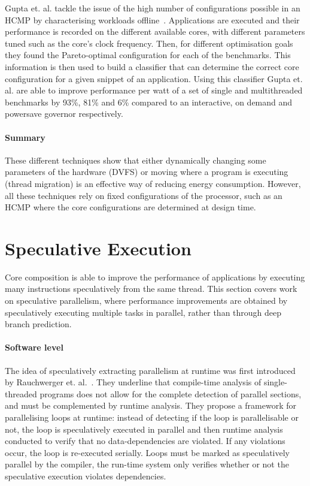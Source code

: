 Gupta et. al. tackle the issue of the high number of configurations possible in an HCMP by characterising workloads offline~\cite{Gupta2017Dypo}.
Applications are executed and their performance is recorded on the different available cores, with different parameters tuned such as the core's clock frequency.
Then, for different optimisation goals they found the Pareto-optimal configuration for each of the benchmarks.
This information is then used to build a classifier that can determine the correct core configuration for a given snippet of an application.
Using this classifier Gupta et. al. are able to improve performance per watt of a set of single and multithreaded benchmarks by 93\%, 81\% and 6\% compared to an interactive, on demand and powersave governor respectively.

\paragraph*{Summary}
These different techniques show that either dynamically changing some parameters of the hardware (DVFS) or moving where a program is executing (thread migration) is an effective way of reducing energy consumption.
However, all these techniques rely on fixed configurations of the processor, such as an HCMP where the core configurations are determined at design time. 
\vspace{-1em}
\section{Speculative Execution}
Core composition is able to improve the performance of applications by executing many instructions speculatively from the same thread.
This section covers work on speculative parallelism, where performance improvements are obtained by speculatively executing multiple tasks in parallel, rather than through deep branch prediction.

\paragraph*{Software level}
The idea of speculatively extracting parallelism at runtime was first introduced by Rauchwerger et. al.~\cite{runtimeSpec}.
They underline that compile-time analysis of single-threaded programs does not allow for the complete detection of parallel sections, and must be complemented by runtime analysis.
They propose a framework for parallelising loops at runtime: instead of detecting if the loop is parallelisable or not, the loop is speculatively executed in parallel and then runtime analysis conducted to verify that no data-dependencies are violated.
If any violations occur, the loop is re-executed serially.
Loops must be marked as speculatively parallel by the compiler, the run-time system only verifies whether or not the speculative execution violates dependencies.

